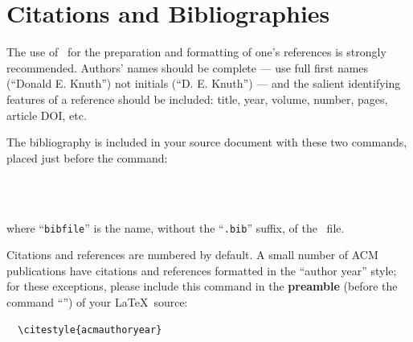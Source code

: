 \section{Citations and Bibliographies}

The use of \BibTeX\ for the preparation and formatting of one's
references is strongly recommended. Authors' names should be complete
--- use full first names (``Donald E. Knuth'') not initials
(``D. E. Knuth'') --- and the salient identifying features of a
reference should be included: title, year, volume, number, pages,
article DOI, etc.

The bibliography is included in your source document with these two
commands, placed just before the \verb|| command:
\begin{verbatim}
  
  
\end{verbatim}
where ``\verb|bibfile|'' is the name, without the ``\verb|.bib|''
suffix, of the \BibTeX\ file.

Citations and references are numbered by default. A small number of
ACM publications have citations and references formatted in the
``author year'' style; for these exceptions, please include this
command in the {\bfseries preamble} (before the command
``\verb||'') of your \LaTeX\ source:
\begin{verbatim}
  \citestyle{acmauthoryear}
\end{verbatim}


